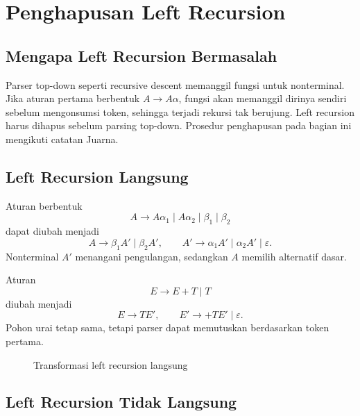 \section{Penghapusan Left Recursion}
\label{sec:ch09-left-recursion}

\subsection{Mengapa Left Recursion Bermasalah}

Parser top-down seperti recursive descent memanggil fungsi untuk
nonterminal. Jika aturan pertama berbentuk \(A \to A\alpha\), fungsi
 akan memanggil dirinya sendiri sebelum mengonsumsi
token, sehingga terjadi rekursi tak berujung. Left recursion harus
dihapus sebelum parsing top-down. Prosedur penghapusan pada bagian ini
mengikuti catatan Juarna.

\subsection{Left Recursion Langsung}

Aturan berbentuk
\[
A \to A\alpha_1 \mid A\alpha_2 \mid \beta_1 \mid \beta_2
\]
dapat diubah menjadi
\[
A \to \beta_1 A' \mid \beta_2 A', \qquad
A' \to \alpha_1 A' \mid \alpha_2 A' \mid \varepsilon.
\]
Nonterminal \(A'\) menangani pengulangan, sedangkan \(A\) memilih
alternatif dasar.

\begin{contoh}
Aturan
\[
E \to E + T \mid T
\]
diubah menjadi
\[
E \to T E', \qquad E' \to + T E' \mid \varepsilon.
\]
Pohon urai tetap sama, tetapi parser dapat memutuskan berdasarkan
token pertama.
\end{contoh}

\begin{figure}[H]
\centering
{}
\caption{Transformasi left recursion langsung}
\label{fig:ch09-left-recursion}
\end{figure}

\subsection{Left Recursion Tidak Langsung}

